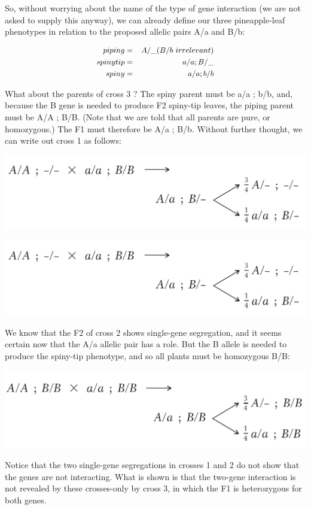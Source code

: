 \documentclass[11pt,ignorenonframetext,aspectratio=169]{beamer}
\begin{document}
\begin{frame}{}
\protect\hypertarget{section-6}{}
So, without worrying about the name of the type of gene interaction (we
are not asked to supply this anyway), we can already define our three
pineapple-leaf phenotypes in relation to the proposed allelic pairs A/a
and B/b:

\[
\small
\begin{aligned}
piping &=& A/\_ (B/b~irrelevant) \\
spiny tip &=& a/a; B/\_ \\
spiny &=& a/a; b/b
\end{aligned}
\]

What about the parents of cross 3 ? The spiny parent must be a/a ; b/b,
and, because the B gene is needed to produce F2 spiny-tip leaves, the
piping parent must be A/A ; B/B. (Note that we are told that all parents
are pure, or homozygous.) The F1 must therefore be A/a ; B/b. Without
further thought, we can write out cross 1 as follows:
\end{frame}

\begin{frame}{}
\protect\hypertarget{section-7}{}
\footnotesize

\begin{center}\includegraphics[width=0.34\linewidth]{./images/cross2_ab} \end{center}

\begin{center}\includegraphics[width=0.34\linewidth]{./images/cross2_ab} \end{center}

We know that the F2 of cross 2 shows single-gene segregation, and it
seems certain now that the A/a allelic pair has a role. But the B allele
is needed to produce the spiny-tip phenotype, and so all plants must be
homozygous B/B:

\begin{center}\includegraphics[width=0.34\linewidth]{./images/cross_multiple} \end{center}

Notice that the two single-gene segregations in crosses 1 and 2 do not
show that the genes are not interacting. What is shown is that the
two-gene interaction is not revealed by these crosses-only by cross 3,
in which the F1 is heterozygous for both genes.
\end{frame}
\end{document}
